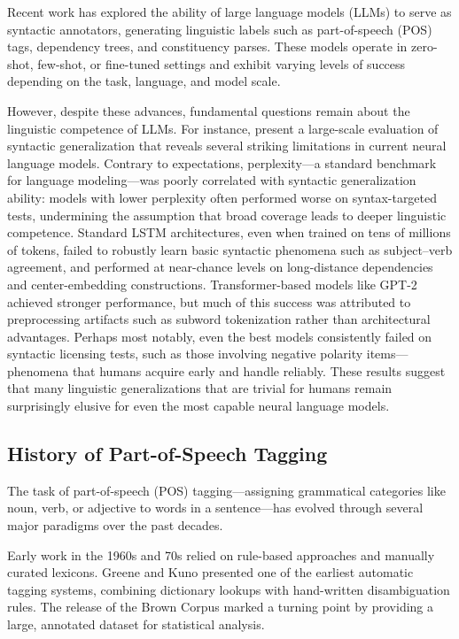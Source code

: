 Recent work has explored the ability of large language models (LLMs) to serve as syntactic annotators, generating linguistic labels such as part-of-speech (POS) tags, dependency trees, and constituency parses. These models operate in zero-shot, few-shot, or fine-tuned settings and exhibit varying levels of success depending on the task, language, and model scale.

However, despite these advances, fundamental questions remain about the linguistic competence of LLMs. For instance, \citet{hu2020systematic} present a large-scale evaluation of syntactic generalization that reveals several striking limitations in current neural language models. Contrary to expectations, perplexity—a standard benchmark for language modeling—was poorly correlated with syntactic generalization ability: models with lower perplexity often performed worse on syntax-targeted tests, undermining the assumption that broad coverage leads to deeper linguistic competence. Standard LSTM architectures, even when trained on tens of millions of tokens, failed to robustly learn basic syntactic phenomena such as subject–verb agreement, and performed at near-chance levels on long-distance dependencies and center-embedding constructions. Transformer-based models like GPT-2 achieved stronger performance, but much of this success was attributed to preprocessing artifacts such as subword tokenization rather than architectural advantages. Perhaps most notably, even the best models consistently failed on syntactic licensing tests, such as those involving negative polarity items—phenomena that humans acquire early and handle reliably. These results suggest that many linguistic generalizations that are trivial for humans remain surprisingly elusive for even the most capable neural language models.

\subsection{History of Part-of-Speech Tagging}

The task of part-of-speech (POS) tagging—assigning grammatical categories like noun, verb, or adjective to words in a sentence—has evolved through several major paradigms over the past decades.

Early work in the 1960s and 70s relied on rule-based approaches and manually curated lexicons. Greene and Kuno \cite{greene1963automatic} presented one of the earliest automatic tagging systems, combining dictionary lookups with hand-written disambiguation rules. The release of the Brown Corpus \cite{francis1979brown} marked a turning point by providing a large, annotated dataset for statistical analysis.

